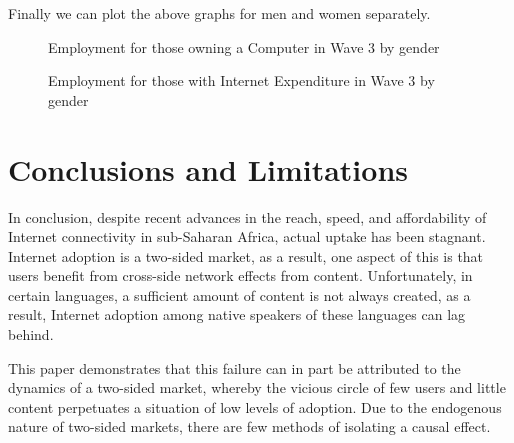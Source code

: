 \documentclass[a4paper,british]{article}\usepackage[]{graphicx}\usepackage[]{color}
\makeatletter
\newenvironment{kframe}{%
 \def\at@end@of@kframe{}%
 \ifinner\ifhmode%
  \def\at@end@of@kframe{\end{minipage}}%
  \begin{minipage}{\columnwidth}%
 \fi\fi%
 \def\FrameCommand##1{\hskip\@totalleftmargin \hskip-\fboxsep
 \colorbox{shadecolor}{##1}\hskip-\fboxsep
     \hskip-\linewidth \hskip-\@totalleftmargin \hskip\columnwidth}%
 \MakeFramed {\advance\hsize-\width
   \@totalleftmargin\z@ \linewidth\hsize
   \@setminipage}}%
 {\par\unskip\endMakeFramed%
 \at@end@of@kframe}
\newenvironment{knitrout}{}{} %
\makeatother
\begin{document}
Finally we can plot the above graphs for men and women separately.

\begin{figure}[H]
\caption{Employment for those owning a Computer in Wave 3 by gender}

\begin{knitrout}
\color{fgcolor}\begin{kframe}


{\ttfamily\noindent\bfseries\color{errorcolor}{\#\# Error in grouped\_df\_impl(data, unname(vars), drop): Column `woman` is unknown}}\end{kframe}
\end{knitrout}
\end{figure}

\begin{figure}[H]
\caption{Employment for those with Internet Expenditure in Wave 3 by gender}

\begin{knitrout}
\color{fgcolor}\begin{kframe}


{\ttfamily\noindent\bfseries\color{errorcolor}{\#\# Error in grouped\_df\_impl(data, unname(vars), drop): Column `woman` is unknown}}\end{kframe}
\end{knitrout}
\end{figure}


\section{Conclusions and Limitations}

\label{sec:conclusions}In conclusion, despite recent advances in
the reach, speed, and affordability of Internet connectivity in sub-Saharan
Africa, actual uptake has been stagnant. Internet adoption is a two-sided
market, as a result, one aspect of this is that users benefit from
cross-side network effects from content. Unfortunately, in certain
languages, a sufficient amount of content is not always created, as
a result, Internet adoption among native speakers of these languages
can lag behind.

This paper demonstrates that this failure can in part be attributed
to the dynamics of a two-sided market, whereby the vicious circle
of few users and little content perpetuates a situation of low levels
of adoption. Due to the endogenous nature of two-sided markets, there
are few methods of isolating a causal effect.
\end{document}
